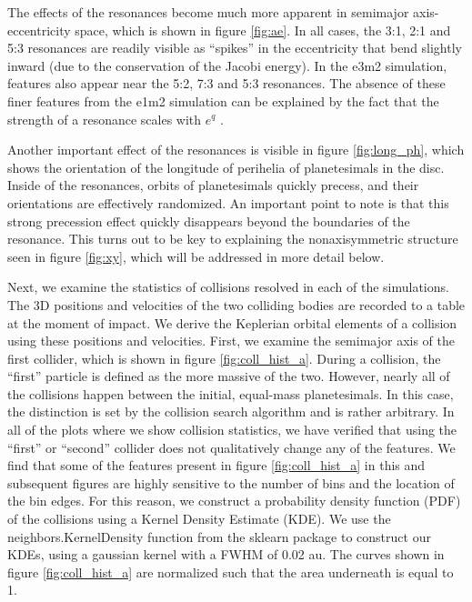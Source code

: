 The effects of the resonances become much more apparent in semimajor axis-eccentricity space, which is shown in figure 
\ref{fig:ae}. In all cases, the 3:1, 2:1 and 5:3 resonances are readily visible as ``spikes'' in the eccentricity that bend slightly 
inward (due to the conservation of the Jacobi energy). In the e3m2 simulation, features also appear near the 5:2, 7:3 and 5:3 
resonances. The absence of these finer features from the e1m2 simulation can be explained by the fact that the strength of a 
resonance scales with $e^{q}$ \cite{malhotra94}.

Another important effect of the resonances is visible in figure \ref{fig:long_ph}, which shows the orientation of the longitude of 
perihelia of planetesimals in the disc. Inside of the resonances, orbits of planetesimals quickly precess, and their orientations are 
effectively randomized. An important point to note is that this strong precession effect quickly disappears beyond the boundaries 
of the resonance. This turns out to be key to explaining the nonaxisymmetric structure seen in figure \ref{fig:xy}, which will be 
addressed in more detail below.

Next, we examine the statistics of collisions resolved in each of the simulations. The 3D positions and velocities of the two 
colliding bodies are recorded to a table at the moment of impact. We derive the Keplerian orbital elements of a collision using 
these positions and velocities. First, we examine the semimajor axis of the first collider, which is shown in figure 
\ref{fig:coll_hist_a}. During a collision, the ``first'' particle is defined as the more massive of the two. However, nearly all of the 
collisions happen between the initial, equal-mass planetesimals. In this case, the distinction is set by the collision search 
algorithm and is rather arbitrary. In all of the plots where we show collision statistics, we have verified that using the ``first'' or 
``second'' collider does not qualitatively change any of the features. We find that some of the features present in figure 
\ref{fig:coll_hist_a} in this and subsequent figures are highly sensitive to the number of bins and the location of the bin edges. 
For this reason, we construct a probability density function (PDF) of the collisions using a Kernel Density Estimate (KDE). We 
use the {\sc neighbors.KernelDensity} function from the {\sc sklearn} \cite{scikit-learn} package to construct our KDEs, using a 
gaussian kernel with a FWHM of 0.02 au. The curves shown in figure \ref{fig:coll_hist_a} are normalized such that the area 
underneath is equal to 1.

